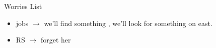 
\begin{frame}{Worries List}
\begin{itemize}
\item jobs $\rightarrow$ we'll find something , we'll look for something on east. 
\item RS $\rightarrow$ forget her 
\end{itemize} 

\end{frame}
